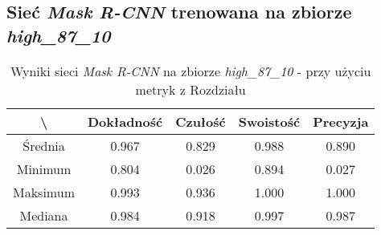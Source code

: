 \subsection{Sieć \textit{Mask R-CNN} trenowana na zbiorze \textit{high\_87\_10}}
\label{sec:results_high_original}

\begin{table}[H]
	\centering
	\caption{Wyniki sieci \textit{Mask R-CNN} na zbiorze \textit{high\_87\_10} - przy użyciu metryk z Rozdziału }
	\vspace{6pt}
	{\footnotesize
		\begin{tabular}{|c|c|c|c|c|}
      \hline \textbackslash & Dokładność & Czułość & Swoistość & Precyzja \\
      \hline Średnia & 0.967 & 0.829 & 0.988 & 0.890 \\
      \hline Minimum & 0.804 & 0.026 & 0.894 & 0.027 \\
      \hline Maksimum & 0.993 & 0.936 & 1.000 & 1.000 \\
      \hline Mediana & 0.984 & 0.918 & 0.997 & 0.987 \\
      \hline
		\end{tabular}
	}
  \vspace{0pt}
  \label{Tab:high_original_calculated}
\end{table}

